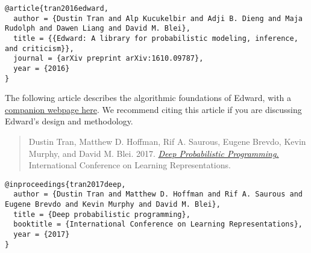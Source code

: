 \begin{lstlisting}[class=JSON]
@article{tran2016edward,
  author = {Dustin Tran and Alp Kucukelbir and Adji B. Dieng and Maja Rudolph and Dawen Liang and David M. Blei},
  title = {{Edward: A library for probabilistic modeling, inference, and criticism}},
  journal = {arXiv preprint arXiv:1610.09787},
  year = {2016}
}
\end{lstlisting}

The following article describes the algorithmic foundations of Edward,
with a \href{/iclr2017}{companion webpage here}.
We recommend citing this article if you are discussing Edward's
design and methodology.

\begin{quote}
Dustin Tran, Matthew D. Hoffman, Rif A. Saurous, Eugene Brevdo, Kevin
Murphy, and David M. Blei.
2017.
\href{https://arxiv.org/abs/1701.03757}{\emph{Deep Probabilistic Programming.}}
International Conference on Learning Representations.
\end{quote}

\begin{lstlisting}[class=JSON]
@inproceedings{tran2017deep,
  author = {Dustin Tran and Matthew D. Hoffman and Rif A. Saurous and Eugene Brevdo and Kevin Murphy and David M. Blei},
  title = {Deep probabilistic programming},
  booktitle = {International Conference on Learning Representations},
  year = {2017}
}
\end{lstlisting}
